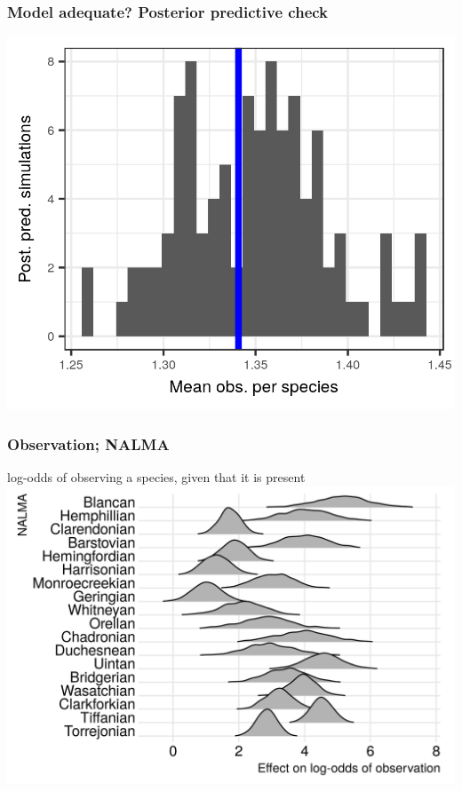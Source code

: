 \documentclass[aspectratio=169]{beamer}
\begin{document}
\begin{frame}
  \frametitle{Model adequate? Posterior predictive check}
  \begin{center}
    \includegraphics[height=0.8\textheight,width=\textwidth,keepaspectratio=true]{figure/pred_occ_bd}
  \end{center}
\end{frame}

\begin{frame}
  \frametitle{Observation; NALMA}
  \begin{center}
    log-odds of observing a species, given that it is present
    \includegraphics[height=0.775\textheight,width=\textwidth,keepaspectratio=true]{figure/time_observation}
  \end{center}
\end{frame}
\end{document}

